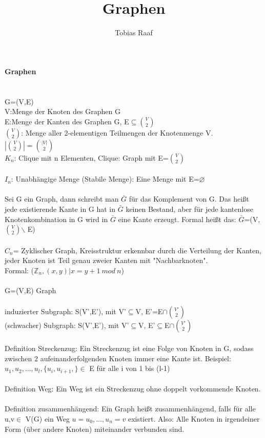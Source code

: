 \documentclass{scrartcl}
\title{Graphen}
\author{Tobias Raaf}
\begin{document}
	\large \textbf{Graphen}\\\\
	\normalsize\\ G=(V,E)\\
	V:Menge der Knoten des Graphen G\\
	E:Menge der Kanten des Graphen G, E$\subseteq\binom{V}{2}$\\
	$\binom{V}{2}$: Menge aller 2-elementigen Teilmengen der Knotenmenge V.\\
	$|\binom{V}{2}|=\binom{|V|}{2}$\\
	$K_n$: Clique mit n Elementen, Clique: Graph mit E=$\binom{V}{2}$\\\\
	$I_n$: Unabhängige Menge (Stabile Menge): Eine Menge mit E=$\varnothing$\\\\
	Sei G ein Graph, dann schreibt man $\bar{G}$ für das Komplement von G. Das heißt jede existierende Kante in G hat in $\bar{G}$ keinen Bestand, aber für jede kantenlose Knotenkombination in G wird in $\bar{G}$ eine Kante erzeugt. Formal heißt das: $\bar{G}$=(V,$\binom{V}{2}$$\backslash$ E)\\\\
	$C_n$= Zyklischer Graph, Kreisstruktur erkennbar durch die Verteilung der Kanten, jeder Knoten ist Teil genau zweier Kanten mit "Nachbarknoten". \\Formal: ($\mathbb{Z}_n,{(x,y)|x=y+1~ mod ~n}$)\\\\
	G=(V,E) Graph\\
	\\
	induzierter Subgraph: S(V',E'), mit V'$\subseteq$V, E'=E$\cap\binom{V'}{2}$\\
	(schwacher) Subgraph: S(V',E'), mit V'$\subseteq$V, E'$\subseteq$E$\cap\binom{V'}{2}$\\ \\
	Definition Streckenzug: Ein Streckenzug ist eine Folge von Knoten in G, sodass zwischen 2 aufeinanderfolgenden Knoten immer eine Kante ist.
	Beispiel:$u_1,u_2,...,u_l, \{u_i,u_{i+1},\}$$\in$ E für alle i von 1 bis (l-1)\\\\
	Definition Weg: Ein Weg ist ein Streckenzug ohne doppelt vorkommende Knoten.\\\\
	Definition zusammenhängend: Ein Graph heißt zusammenhängend, falls für alle u,v$\in$ V(G) ein Weg $u=u_0,...,u_n=v$ existiert. Also: Alle Knoten in irgendeiner Form (über andere Knoten) miteinander verbunden sind.\\\\
\end{document}

